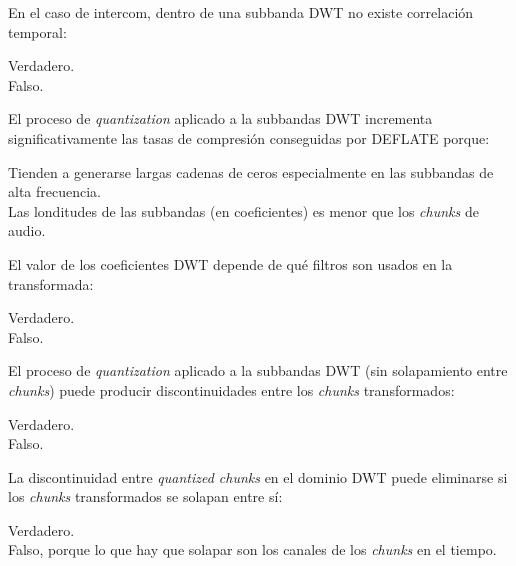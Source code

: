 \documentclass[legalpaper, 12pt, addpoints]{exam}
\begin{document}
\begin{questions}
\vspace{0.10in}

\question En el caso de intercom, dentro de una subbanda DWT no existe correlación temporal:

\begin{oneparchoices}
  \choice Verdadero.\\
  \choice Falso.
\end{oneparchoices}
  
\vspace{0.10in}

\question El proceso de \emph{quantization} aplicado a la subbandas DWT
incrementa significativamente las tasas de compresión conseguidas por
DEFLATE porque:

\begin{oneparchoices}
  \choice Tienden a generarse largas cadenas de ceros especialmente en las subbandas de alta frecuencia.\\
  \choice Las londitudes de las subbandas (en coeficientes) es menor que los \emph{chunks} de audio.
\end{oneparchoices}
  
\vspace{0.10in}

\question El valor de los coeficientes DWT depende de qué filtros son usados en la transformada:

\begin{oneparchoices}
  \choice Verdadero.\\
  \choice Falso.
\end{oneparchoices}
  
\vspace{0.10in}

\question El proceso de \emph{quantization} aplicado a la subbandas DWT (sin solapamiento entre \emph{chunks})
puede producir discontinuidades entre los \emph{chunks} transformados:

\begin{oneparchoices}
  \choice Verdadero.\\
  \choice Falso.
\end{oneparchoices}
  
\vspace{0.10in}

\question La discontinuidad entre \emph{quantized chunks} en el dominio
DWT puede eliminarse si los \emph{chunks} transformados se solapan entre sí:

\begin{oneparchoices}
  \choice Verdadero.\\
  \choice Falso, porque lo que hay que solapar son los canales de los \emph{chunks} en el tiempo.
\end{oneparchoices}
  

\end{questions}
\end{document}
